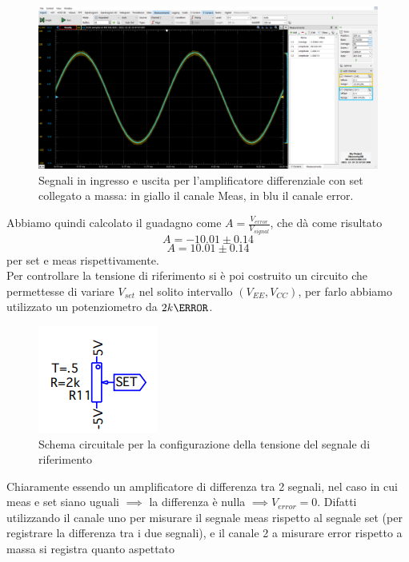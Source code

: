 \documentclass[10pt, a4paper, italian]{article}
\begin{document}
\begin{figure}[H]
    \centering
	\includegraphics[scale=0.7]{error.meas}
    \caption{Segnali in ingresso e uscita per l'amplificatore differenziale con set collegato a massa: in giallo il canale Meas, in blu il canale error.
    \label{fig: Draft1}}
\end{figure}
Abbiamo quindi calcolato il guadagno come $A = \frac{V_{error}}{V_{signal}}$, che dà come risultato
\[
A=-10.01 \pm 0.14 
\]
\[
A=10.01 \pm 0.14
\]
per set e meas rispettivamente.\\
Per controllare la tensione di riferimento si è poi costruito un circuito che permettesse di variare $V_{set}$ nel solito intervallo $(V_{EE},V_{CC})$, per farlo abbiamo utilizzato un potenziometro da $2 k\ohm$.
\begin{figure}[H]
    \centering
	\includegraphics[scale=0.7]{setgen}
    \caption{Schema circuitale per la configurazione  della tensione del segnale di riferimento 
    \label{fig: Draft1}}
\end{figure}
Chiaramente essendo un amplificatore di differenza tra 2 segnali, nel caso in cui meas e set siano uguali $\implies$ la differenza è nulla $\implies V_{error} = 0$. Difatti utilizzando il canale uno per misurare il segnale meas rispetto al segnale set (per registrare la differenza tra i due segnali), e il canale 2 a misurare error rispetto a massa si registra quanto aspettato
\end{document}
